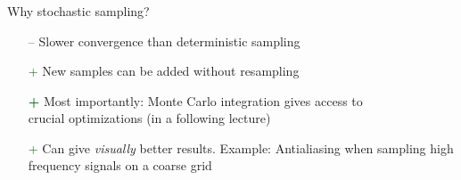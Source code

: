 \documentclass[utf8,stillsansserifmath,fleqn,t]{beamer}
\begin{document}
\begin{frame}
\frametitle{\insertsection}
Why stochastic sampling?
\begin{itemize}
\item[\textcolor{DarkRed}{--}] Slower convergence than deterministic sampling
\item[\textcolor{DarkGreen}{+}] New samples can be added without resampling
\item[\textcolor{DarkGreen}{\textbf{+}}] Most importantly: Monte Carlo integration gives access to\\
    crucial optimizations (in a following lecture)
\item[\textcolor{DarkGreen}{+}] Can give \emph{visually} better results.
Example: Antialiasing when sampling high frequency signals on a coarse grid\\

\end{itemize}
\end{frame}
\end{document}
